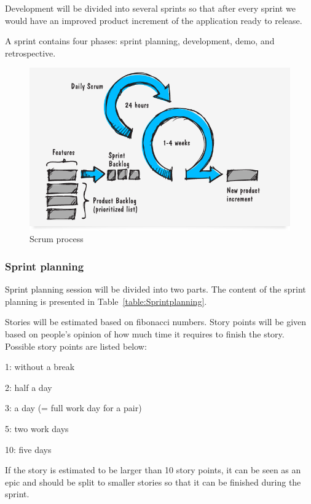 Development will be divided into several sprints so that after every sprint we 
would have an improved product increment of the application ready to release. 

A sprint contains four phases: sprint planning, development, demo, and 
retrospective. 

\begin{figure}[H]
\centering
\includegraphics[width=1\textwidth]{imgs/scrum_process_en.png}
\caption{Scrum process}
\label{fig:scrum}
\end{figure}

\subsubsection{Sprint planning}

Sprint planning session will be divided into two parts. The content of the 
sprint planning is presented in Table~\ref{table:Sprintplanning}.

Stories will be estimated based on fibonacci numbers.
Story points will be given based on people’s opinion of how much time it 
requires to finish the story. Possible story points are listed below:
\begin{description*}
\item[1:] without a break
\item[2:] half a day
\item[3:] a day (= full work day for a pair)
\item[5:] two work days
\item[10:] five days
\end{description*}
	
If the story is estimated to be larger than 10 story points, it can be seen as 
an epic and should be split to smaller stories so that it can be finished 
during the sprint.



